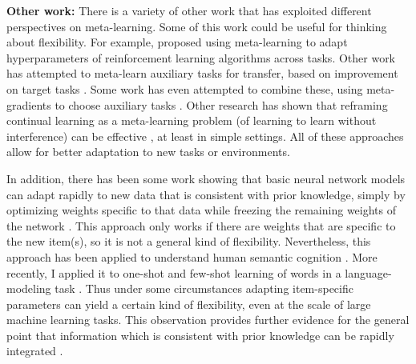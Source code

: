 \textbf{Other work:} There is a variety of other work that has exploited different perspectives on meta-learning. Some of this work could be useful for thinking about flexibility. For example, \citet{Xu2018} proposed using meta-learning to adapt hyperparameters of reinforcement learning algorithms across tasks. Other work has attempted to meta-learn auxiliary tasks for transfer, based on improvement on target tasks \citep{Liu2019a}. Some work has even attempted to combine these, using meta-gradients to choose auxiliary tasks \citep{Veeriah2019}. Other research has shown that reframing continual learning as a meta-learning problem (of learning to learn without interference) can be effective \citep{Velez2017}, at least in simple settings. All of these approaches allow for better adaptation to new tasks or environments. \par
In addition, there has been some work showing that basic neural network models can adapt rapidly to new data that is consistent with prior knowledge, simply by optimizing weights specific to that data while freezing the remaining weights of the network \citep{Rumelhart1993}. This approach only works if there are weights that are specific to the new item(s), so it is not a general kind of flexibility. Nevertheless, this approach has been applied to understand human semantic cognition \citep{Rogers2004}. More recently, I applied it to one-shot and few-shot learning of words in a language-modeling task \citep{Lampinen2018a}. Thus under some circumstances adapting item-specific parameters can yield a certain kind of flexibility, even at the scale of large machine learning tasks. This observation provides further evidence for the general point that information which is consistent with prior knowledge can be rapidly integrated \citep{McClelland2013, McClelland2020}. \par 

